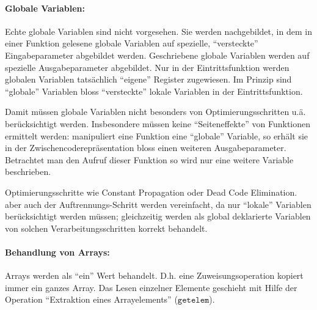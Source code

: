 \documentclass[twoside,a4paper,fleqn,12pt]{article}
\begin{document}
\paragraph{Globale Variablen:}
Echte globale Variablen sind nicht vorgesehen. Sie werden nachgebildet, in dem in einer Funktion gelesene globale Variablen
auf spezielle, "`versteckte"' Eingabeparameter abgebildet werden. Geschriebene globale Variablen werden
auf spezielle Ausgabeparameter abgebildet. Nur in der Eintrittsfunktion werden globalen Variablen tatsächlich
"`eigene"' Register zugewiesen. Im Prinzip sind "`globale"' Variablen bloss "`versteckte"' lokale Variablen in
der Eintrittsfunktion.

Damit müssen globale Variablen nicht besonders von Optimierungsschritten u.ä. berücksichtigt werden.
Insbesondere müssen keine "`Seiteneffekte"' von Funktionen ermittelt werden: manipuliert eine Funktion eine "`globale"' Variable,
so erhält sie in der Zwischencoderepräsentation bloss einen weiteren Ausgabeparameter.
Betrachtet man den Aufruf dieser Funktion so wird nur eine weitere Variable beschrieben.

Optimierungsschritte wie Constant Propagation oder Dead Code Elimination. aber auch der Auftrennungs-Schritt werden vereinfacht,
da nur "`lokale"' Variablen berücksichtigt werden müssen; gleichzeitig werden als global deklarierte Variablen
von solchen Verarbeitungsschritten korrekt behandelt.



\paragraph{Behandlung von Arrays:}
Arrays werden als "`ein"' Wert behandelt. D.h. eine Zuweisungsoperation kopiert immer ein ganzes Array.
Das Lesen einzelner Elemente geschieht mit Hilfe der Operation "`Extraktion eines Arrayelements"' ($\mathtt{getelem}$).
\end{document}
